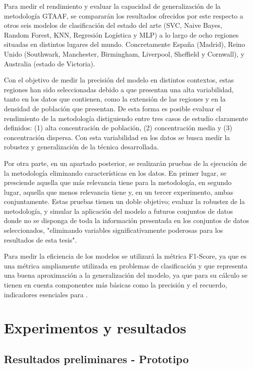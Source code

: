 \documentclass{uathesis-es}
\begin{document}
{	Para medir el rendimiento y evaluar la capacidad de generalización de la metodología GTAAF, se compararán los resultados ofrecidos por este respecto a otros seis modelos de clasificación del estado del arte (SVC, Naive Bayes, Random Forest, KNN, Regresión Logística y MLP) a lo largo de ocho regiones situadas en distintos lugares del mundo. Concretamente España (Madrid), Reino Unido (Southwark, Manchester, Birmingham, Liverpool, Sheffield y Cornwall), y Australia (estado de Victoria).
	
	Con el objetivo de medir la precisión del modelo en distintos contextos, estas regiones han sido seleccionadas debido a que presentan una alta variabilidad, tanto en los datos que contienen, como la extensión de las regiones y en la densidad de población que presentan. De esta forma es posible evaluar el rendimiento de la metodología distiguiendo entre tres casos de estudio claramente definidos: (1) alta concentración de población, (2) concentración media y (3) concentración dispersa. Con esta variabilidad en los datos se busca medir la robustez y generalización de la técnica desarrollada.
	
	Por otra parte, en un apartado posterior, se realizarán pruebas de la ejecución de la metodología eliminando características en los datos. En primer lugar, se presciende aquella que más relevancia tiene para la metodología, en segundo lugar, aquella que menos relevancia tiene y, en un tercer experimento, ambas conjuntamente. Estas pruebas tienen un doble objetivo; evaluar la robustez de la metodología, y simular la aplicación del modelo a futuros conjuntos de datos donde no se disponga de toda la información presentada en los conjuntos de datos seleccionados, "eliminando variables significativamente poderosas para los resultados de esta tesis".
	
	Para medir la eficiencia de los modelos se utilizará la métrica F1-Score, ya que es una métrica ampliamente utilizada en problemas de clasificación y que representa una buena aproximación a la generalización del modelo, ya que para su cálculo se tienen en cuenta componentes más básicas como la precisión y el recuerdo, indicadores esenciales para .
	


\chapter{Experimentos y resultados}



\section{Resultados preliminares - Prototipo}

}
\end{document}
